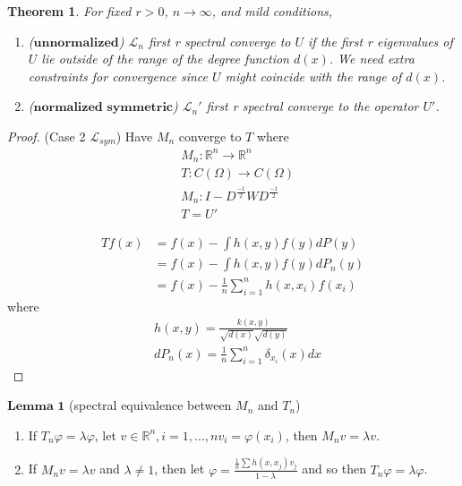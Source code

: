 \documentclass[12pt]{article}
\theoremstyle{plain}
\newtheorem*{theorem}{Theorem}
\begin{document}
\begin{theorem}
For fixed $r > 0$, $n \rightarrow \infty$, and mild conditions,
	\begin{enumerate}
	\item ($\textbf{unnormalized}$) $\mathcal{L}_n$ first r spectral converge to $ U $ if the first r eigenvalues of $ U $ lie outside of the range of the degree function $ d(x) $. We need extra constraints for convergence since $ U $ might coincide with the range of $ d(x) $. 	
	\item ($\textbf{normalized symmetric}$) $\mathcal{L}_n'$ first r spectral converge to the operator $ U' $. 
	\end{enumerate}
\end{theorem}

\begin{proof}
(Case 2 $\mathcal{L}_{sym}$) Have $M_n$ converge to $T$ where 	
	\begin{align*}
	&M_n: \mathds{R}^n \rightarrow \mathds{R}^n \\
	&T: C(\Omega) \rightarrow C(\Omega) \\
	&M_n: I-D^{\frac{-1}{2}}WD^{\frac{-1}{2}} \\
	&T = U'
	\end{align*}	

	\begin{align*}
	Tf(x) &= f(x) - \int h(x,y)f(y)dP(y) \\
	&= f(x) - \int h(x,y)f(y)dP_n(y) \\
	&= f(x) - \frac{1}{n} \sum_{i=1}^n h(x,x_i)f(x_i)
	\end{align*}
where
	\begin{align*}
	&h(x,y) = \frac{k(x,y)}{\sqrt{d(x)}\sqrt{d(y)}} \\
	&dP_n(x) = \frac{1}{n} \sum_{i=1}^n \delta_{x_i}(x) dx
	\end{align*} 
	
\end{proof}

$\textbf{Lemma 1}$ (spectral equivalence between $M_n$ and $T_n$)
\begin{enumerate}
\item If $T_n \varphi = \lambda \varphi$, let $v \in \mathds{R}^n, i = 1,...,n v_i = \varphi(x_i)$, then $M_nv = \lambda v$. 
\item If $M_nv = \lambda v$ and $\lambda \neq 1$, then let $\varphi = \frac{\frac{1}{n} \sum h(x,x_j)v_j}{1-\lambda}$ and so then $T_n\varphi = \lambda\varphi$.
\end{enumerate}
\end{document}
